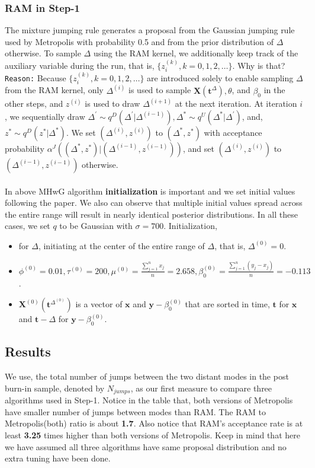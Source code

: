\documentclass{article}
\begin{document}
\subsubsection*{RAM in Step-1}
The mixture jumping rule
generates a proposal from the Gaussian jumping rule used by
Metropolis with probability 0.5 and from the prior distribution of $\Delta$ otherwise. To sample $\Delta$ using the RAM kernel, we
additionally keep track of the auxiliary variable during the run,
that is, $\{z_i^{(k)}, k = 0, 1, 2,\ldots\}$. Why is that? \texttt{Reason:} Because $\{z_i^{(k)}, k = 0, 1, 2,\ldots\}$ are
introduced solely to enable sampling $\Delta$ from the RAM kernel,
only $\Delta^{(i)}$ is used to sample $\mathbf{X}(\boldsymbol{t}^{\Delta}),\theta$, and $\beta_0$ in the other steps, and $z^{(i)}$ is used to draw $\Delta^{(i+1)}$ at the next iteration. 
At iteration $i$, we sequentially draw $\Delta^{'} \sim q^D(\Delta^{'}|\Delta^{(i-1)}), \Delta^{* } \sim q^U(\Delta^{*}|\Delta^{'})$, and, $z^{*} \sim q^D(z^{*}|\Delta^{*})$. We set $(\Delta^{(i)},z^{(i)})$ to $(\Delta^{*},z^{*})$ with acceptance probability $\alpha^J((\Delta^{*},z^{*})|(\Delta^{(i-1)},z^{(i-1)}))$, and set $(\Delta^{(i)},z^{(i)})$ to $(\Delta^{(i-1)},z^{(i-1)})$ otherwise.
\paragraph{}
In above MHwG algorithm \textbf{initialization} is important and we set initial values following the paper. We also can observe that multiple initial values
spread across the entire range will result in nearly identical posterior distributions. In all these cases, we set $q$ to be Gaussian with $\sigma = 700$. Initialization,
\begin{itemize}
    \item for $\Delta$, initiating at the center of the
entire range of $\Delta$, that is, $\Delta^{(0)}=0$.
\item $\phi^{(0)}=0.01,\tau^{(0)}=200,\mu^{(0)}=\frac{\sum_{j=1}^n x_j  }{n}=2.658,\beta_0^{(0)}=\frac{\sum_{j=1}^n (y_j-x_j)}{n}=-0.113$.
\item $\mathbf{X}^{(0)} (\boldsymbol{t}^{\Delta^{(0)}}
 )$ is  a vector of $\boldsymbol{x}$ and $\boldsymbol{y}-\beta_0^{(0)}$  that are sorted
in time, $\boldsymbol{t}$ for $\boldsymbol{x}$ and $\boldsymbol{t}-\Delta$ for $\boldsymbol{y}-\beta_0^{(0)}$. 
\end{itemize}
\subsection*{Results}
We use, the total number of jumps
between the two distant modes in the post burn-in sample,
denoted by $N_{jumps}$, as our first measure to compare three algorithms used in Step-1. Notice in the table that, both versions of Metropolis have smaller number of jumps between modes than RAM. The RAM to Metropolis(both) ratio is about \textbf{1.7}. Also notice that RAM's acceptance rate is at least \textbf{3.25} times higher than both versions of Metropolis. Keep in mind that here we have assumed all three algorithms have same proposal distribution and no extra tuning have been done.
\end{document}
